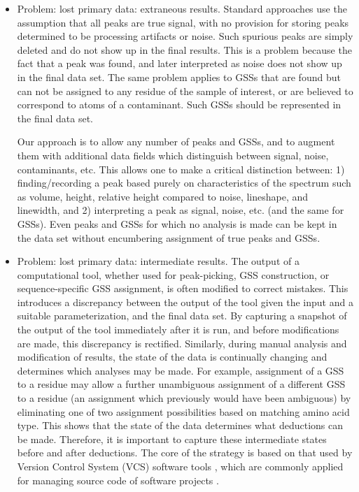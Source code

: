 \begin{itemize}
  \item Problem: lost primary data:  extraneous results.  Standard approaches use the 
  assumption that all peaks are true signal, with no provision for storing peaks 
  determined to be processing artifacts or noise.  Such spurious peaks are simply 
  deleted and do not show up in the final results.  This is a problem because the 
  fact that a peak was found, and later interpreted as noise does not show up in 
  the final data set.  The same problem applies to GSSs that are found 
  but can not be assigned to any residue of the sample of interest, or are 
  believed to correspond to atoms of a contaminant.  Such GSSs should 
  be represented in the final data set.

  Our approach is to allow any number of peaks and GSSs, and to 
  augment them with additional data fields which distinguish between signal, 
  noise, contaminants, etc.  This allows one to make a critical distinction 
  between: 1) finding/recording a peak based purely on characteristics of 
  the spectrum such as volume, height, relative height compared to noise, 
  lineshape, and linewidth, and 2) interpreting a peak as signal, noise, 
  etc. (and the same for GSSs).  Even peaks and GSSs for 
  which no analysis is made can be kept in the data set without encumbering 
  assignment of true peaks and GSSs.

  \item Problem: lost primary data: intermediate results.  The output of a 
  computational tool, whether used for peak-picking, GSS construction, 
  or sequence-specific GSS assignment, is often modified to correct 
  mistakes.  This introduces a discrepancy between the output of the tool 
  given the input and a suitable parameterization, and the final data set.  
  By capturing a snapshot of the output of the tool immediately after it is 
  run, and before modifications are made, this discrepancy is rectified.
  Similarly, during manual analysis and modification of results, the state of 
  the data is continually changing and determines which analyses may be made.  
  For example, assignment of a GSS to a residue may allow a further 
  unambiguous assignment of a different GSS to a residue (an assignment 
  which previously would have been ambiguous) by eliminating one of two 
  assignment possibilities based on matching amino acid type.  This shows that 
  the state of the data determines what deductions can be made.  Therefore, it 
  is important to capture these intermediate states before and after deductions.
  The core of the strategy is based on that used by Version Control System (VCS) 
  software tools \cite{vcs_concepts, hinsen2009vcs}, which are commonly 
  applied for managing source code of 
  software projects \cite{loeliger2012git, cvs, svn}.  


\end{itemize}
